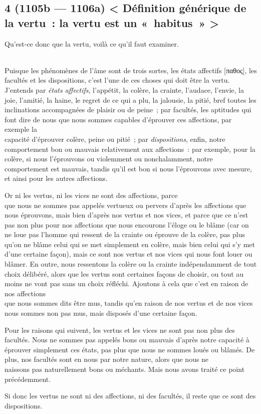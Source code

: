 \documentclass[french,twoside]{book} %
\begin{document}
\subsection[{4 (1105b — 1106a) < Définition générique de la vertu : la vertu est un « habitus » >}]{4 (1105b — 1106a) < Définition générique de la vertu : la vertu est un « habitus » >}
\noindent Qu’est-ce donc que la vertu, voilà ce qu’il faut examiner.\par
\\
Puisque les phénomènes de l’âme sont de trois sortes, les états affectifs [παθος], les facultés et les dispositions, c’est l’une de ces choses qui doit être la vertu. J’entends par {\itshape états affectifs}, l’appétit, la colère, la crainte, l’audace, l’envie, la joie, l’amitié, la haine, le regret de ce qui a plu, la jalousie, la pitié, bref toutes les inclinations accompagnées de plaisir ou de peine ; par facultés, les aptitudes qui font dire de nous que nous sommes capables d’éprouver ces affections, par exemple la \\
capacité d’éprouver colère, peine ou pitié ; par {\itshape dispositions}, enfin, notre comportement bon ou mauvais relativement aux affections : par exemple, pour la colère, si nous l’éprouvons ou violemment ou nonchalamment, notre comportement est mauvais, tandis qu’il est bon si nous l’éprouvons avec mesure, et ainsi pour les autres affections.\par
Or ni les vertus, ni les vices ne sont des affections, parce \\
que nous ne sommes pas appelés vertueux ou pervers d’après les affections que nous éprouvons, mais bien d’après nos vertus et nos vices, et parce que ce n’est pas non plus pour nos affections que nous encourons l’éloge ou le blâme (car on ne loue pas l’homme qui ressent de la crainte ou éprouve de la colère, pas plus qu’on ne blâme celui qui se met simplement en  colère, mais bien celui qui s’y met d’une certaine façon), mais ce sont nos vertus et nos vices qui nous font louer ou blâmer. En outre, nous ressentons la colère ou la crainte indépendamment de tout choix délibéré, alors que les vertus sont certaines façons de choisir, ou tout au moins ne vont pas sans un choix réfléchi. Ajoutons à cela que c’est en raison de nos affections \\
que nous sommes dits être mus, tandis qu’en raison de nos vertus et de nos vices nous sommes non pas mus, mais disposés d’une certaine façon.\par
Pour les raisons qui suivent, les vertus et les vices ne sont pas non plus des facultés. Nous ne sommes pas appelés bons ou mauvais d’après notre capacité à éprouver simplement ces états, pas plus que nous ne sommes loués ou blâmés. De plus, nos facultés sont en nous par notre nature, alors que nous ne \\
naissons pas naturellement bons ou méchants. Mais nous avons traité ce point précédemment.\par
Si donc les vertus ne sont ni des affections, ni des facultés, il reste que ce sont des dispositions.
\end{document}
